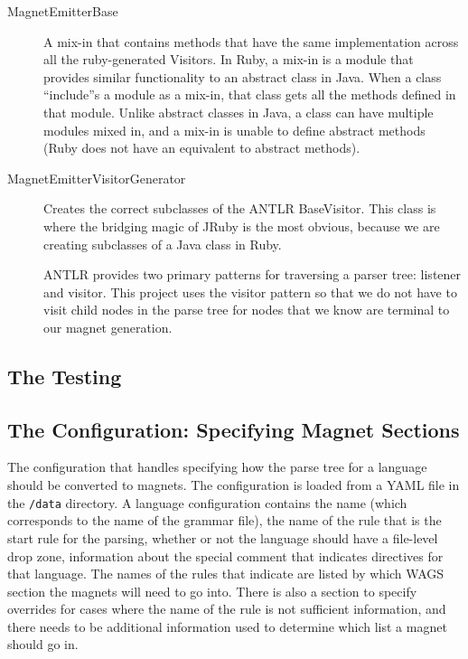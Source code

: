 \documentclass[letter,10pt]{article}
\begin{document}
\begin{description}
 \item [MagnetEmitterBase] A mix-in that contains methods that have the 
same implementation across all the ruby-generated Visitors. In Ruby, a 
mix-in is a module that provides similar functionality to an abstract 
class in Java. When a class ``include''s a module as a mix-in, that 
class gets all the methods defined in that module. Unlike abstract 
classes in Java, a class can have multiple modules mixed in, and a 
mix-in is unable to define abstract methods (Ruby does not have an 
equivalent to abstract methods).

\item[MagnetEmitterVisitorGenerator] Creates the correct subclasses of 
the ANTLR BaseVisitor. This class is where the bridging magic of JRuby 
is the most obvious, because we are creating subclasses of a Java class 
in Ruby.

ANTLR provides two primary patterns for traversing a parser tree: 
listener and visitor. This project uses the visitor pattern so that we 
do not have to visit child nodes in the parse tree for nodes that we 
know are terminal to our magnet generation. 

\end{description}


\subsection{The Testing}

\subsection{The Configuration: Specifying Magnet Sections}
\label{sec:newConfig}

The configuration that handles specifying how the parse tree for a 
language should be converted to magnets. The configuration is loaded 
from a YAML file in the \verb~/data~ directory. A language 
configuration contains the name (which corresponds to the 
name of the grammar file), the name of the rule that is the start rule 
for the parsing, whether or not the language should have a file-level 
drop zone, information about the special comment that indicates 
directives for that language. The names of the rules that indicate are 
listed by which WAGS section the magnets will need to go into. There is 
also a section to specify overrides for cases where the name of the 
rule is not sufficient information, and there needs to be additional 
information used to determine which list a magnet should go in.
\end{document}

